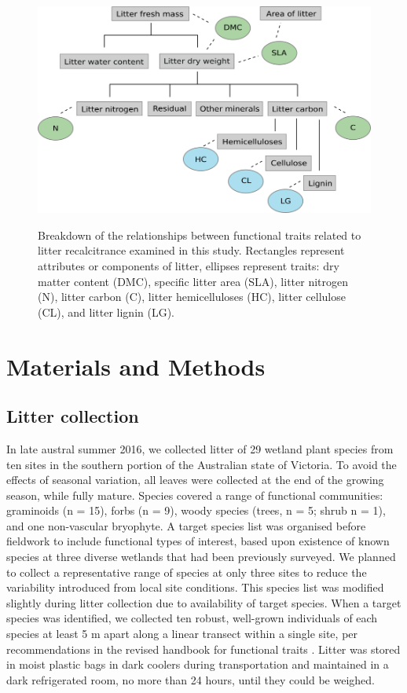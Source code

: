\documentclass{article}
\begin{document}
\begin{figure}[ht]
	\centering
	\scalebox{0.9}
	{\includegraphics[width=\textwidth]{figs/trait_flowchart.png}}
	\caption{Breakdown of the relationships between functional traits related to litter recalcitrance examined in this study. Rectangles represent attributes or components of litter, ellipses represent traits: dry matter content (DMC), specific litter area (SLA), litter nitrogen (N), litter carbon (C), litter hemicelluloses (HC), litter cellulose (CL), and litter lignin (LG).}
	\label{Fig:flowchart}
\end{figure}

\section{Materials and Methods}

\subsection{Litter collection}
In late austral summer 2016, we collected litter of 29 wetland plant species from ten sites in the southern portion of the Australian state of Victoria. To avoid the effects of seasonal variation, all leaves were collected at the end of the growing season, while fully mature. Species covered a range of functional communities: graminoids (n = 15), forbs (n = 9), woody species (trees, n = 5; shrub n = 1), and one non-vascular bryophyte. A target species list was organised before fieldwork to include functional types of interest, based upon existence of known species at three diverse wetlands that had been previously surveyed. We planned to collect a representative range of species at only three sites to reduce the variability introduced from local site conditions. This species list was modified slightly during litter collection due to availability of target species. When a target species was identified, we collected ten robust, well-grown individuals of each species at least 5 m apart along a linear transect within a single site, per recommendations in the revised handbook for functional traits \citep{perez-harguindeguy2013}. Litter was stored in moist plastic bags in dark coolers during transportation and maintained in a dark refrigerated room, no more than 24 hours, until they could be weighed. 
\end{document}
